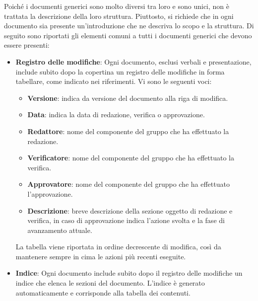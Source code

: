 Poiché i documenti generici sono molto diversi tra loro e sono unici, non è
trattata la descrizione della loro struttura. Piuttosto, si richiede che in ogni
documento sia presente un'introduzione che ne descriva lo scopo e la struttura.
Di seguito sono riportati gli elementi comuni a tutti i documenti generici che
devono essere presenti:
\begin{itemize}
	\item \textbf{Registro delle modifiche}:
	      Ogni documento, esclusi verbali e presentazione, include subito dopo
	      la copertina un registro delle modifiche in forma tabellare, come
	      indicato nei riferimenti. Vi sono le seguenti voci:
	      \begin{itemize}
		      \item \textbf{Versione}: indica da versione del documento alla
		            riga di modifica.
		      \item \textbf{Data}: indica la data di redazione, verifica o
		            approvazione.
		      \item \textbf{Redattore}: nome del componente del gruppo che ha
		            effettuato la redazione.
		      \item \textbf{Verificatore}: nome del componente del gruppo che ha
		            effettuato la verifica.
		      \item \textbf{Approvatore}: nome del componente del gruppo che ha
		            effettuato l'approvazione.
		      \item \textbf{Descrizione}: breve descrizione della sezione
		            oggetto di redazione e verifica, in caso di approvazione
		            indica l'azione svolta e la fase di avanzamento attuale.
	      \end{itemize}
	      \noindent
	      La tabella viene riportata in ordine decrescente di modifica, così da
	      mantenere sempre in cima le azioni più recenti eseguite.

	\item \textbf{Indice}:
	      Ogni documento include subito dopo il registro delle modifiche un
	      indice che elenca le sezioni del documento. L'indice è generato
	      automaticamente e corrisponde alla tabella dei contenuti.


\end{itemize}
